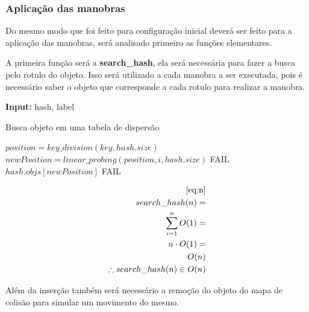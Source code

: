 \documentclass[11pt]{article}
\begin{document}
\bigskip


\subsubsection{Aplicação das manobras}
\label{sec:org6f43d56}

Do mesmo modo que foi feito para configuração inicial deverá ser feito para a aplicação das manobras, será analisado primeiro as funções elementares.

A primeira função será a \textbf{search\_hash}, ela será necessária para fazer a busca pelo rotulo do objeto. Isso será utilizado a cada manobra a ser executada, pois é necessário saber o objeto que corresponde a cada rotulo para realizar a manobra.

\begin{algorithm}
\textbf{Input:} hash, label
\caption{Busca objeto em uma tabela de dispersão}\label{algorithmdpsmudar}
\begin{algorithmic}[1]
	\State $position=key\_division(key,hash.size)$
		\State $newPosition = linear\_probing(position,i,hash.size)$
		\State \Return FAIL
		\EndIf
		\State \Return $hash.objs[newPosition]$
		\EndIf
	\EndFor
	\State \Return FAIL
\EndProcedure
\end{algorithmic}
\end{algorithm}

\begin{equation}
\begin{aligned}
\eqref{eq:n}\\
search\_hash(n)=\\
\sum_{i=1}^{n} O(1)=\\
n\cdot O(1)=\\
O(n)\\
\therefore search\_hash(n) \in O(n)
\end{aligned}
\end{equation}

Além da inserção também será necessário a remoção do objeto do mapa de colisão para simular um movimento do mesmo.
\end{document}
